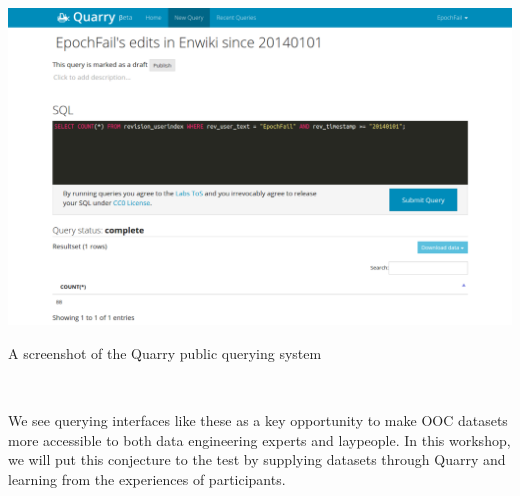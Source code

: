 \begin{marginfigure}[-35pc]
  \begin{minipage}{\marginparwidth}
    \centering
    \includegraphics[width=0.9\marginparwidth]{figures/quarry}
    \caption{A screenshot of the Quarry public querying system}~\label{fig:marginfig}
  \end{minipage}
\end{marginfigure}

We see querying interfaces like these as a key opportunity to make OOC datasets more accessible to both data engineering experts and laypeople.  In this workshop, we will put this conjecture to the test by supplying datasets through Quarry and learning from the experiences of participants.
